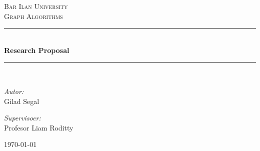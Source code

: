 \begin{titlepage}

  \newcommand{\HRule}{\rule{\linewidth}{0.5mm}} %

  \center %



  \textsc{\Large Bar Ilan University}\\[0.8cm] %
  \textsc{\large Graph Algorithms}\\[0.5cm] 

  
  

  \vspace{1.5 cm}
  \HRule \\[0.4cm]
  { \huge \bfseries Research Proposal}\\[0.4cm] %
  \HRule \\[1.5cm]
 

\begin{minipage}{0.46\textwidth}
\begin{flushleft} \large
\vspace{-0.6cm}	
\emph{Autor:}\\	
Gilad Segal\\
\end{flushleft}								
\end{minipage}		
\begin{minipage}{0.52\textwidth}		
\vspace{-0.6cm}								
\begin{flushright} \large					
\emph{Supervisoer:} \\						
Profesor Liam Roditty\\
\end{flushright}					
\end{minipage}	


  \vspace{10 cm}
  {\large \today}\\[3cm] %


\vfill %

\end{titlepage}


\newpage